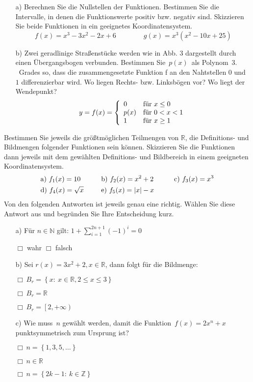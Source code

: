 	\begin{itemize}
		\item[a)] Berechnen Sie die Nullstellen der Funktionen. Bestimmen Sie die Intervalle, in denen die Funktionswerte positiv bzw. negativ sind. Skizzieren Sie beide Funktionen in ein geeignetes Koordinatensystem.
		\begin{equation*}
			f(x)= x^3 - 3x^2 - 2x + 6 \qquad \qquad g(x)= x^3\left(x^2 - 10x + 25\right)
		\end{equation*}
		\item[b)] Zwei geradlinige Straßenstücke werden wie in Abb. 3 dargestellt durch einen Übergangsbogen verbunden. Bestimmen Sie~$p(x)$~als Polynom~$3.$~Grades so, dass die zusammengesetzte Funktion f an den Nahtstellen $0$ und $1$ differenzierbar wird. Wo liegen Rechts- bzw. Linksbögen vor? Wo liegt der Wendepunkt?
		\begin{equation*}
			y=f(x)= \left\{ \begin{array}{ll}
				0 & \textnormal{für}~x \leq 0\\
				p(x) & \textnormal{für}~0<x<1\\
				1 & \textnormal{für}~x \geq 1
				\end{array}
			\right.
		\end{equation*}
	\end{itemize}
	Bestimmen Sie jeweils die größtmöglichen Teilmengen von $\mathbb{R}$, die Definitions- und Bildmengen folgender Funktionen sein können. Skizzieren Sie die Funktionen dann jeweils mit dem gewählten Definitions- und Bildbereich in einem geeigneten Koordinatensystem.
		\begin{alignat*}{3}
			&\textnormal{a)}~f_1(x)= 10 \qquad &&\textnormal{b)}~f_2(x)= x^2 + 2 \qquad &&\textnormal{c)}~f_3(x)= x^3\\
			&\textnormal{d)}~f_4(x)= \sqrt{x} &&\textnormal{e)}~f_5(x)= |x| - x &&
		\end{alignat*}
		Von den folgenden Antworten ist jeweils genau eine richtig. Wählen Sie diese Antwort aus und begründen Sie Ihre Entscheidung kurz.
		\begin{itemize}
			\item[a)] Für $n \in \mathbb{N}$ gilt: $1+\sum_{i=1}^{2n+1}\left(-1\right)^i = 0$
			
			$\Box$ wahr \qquad \quad $\Box$ falsch
			\item[b)] Sei $r(x)= 3x^2 + 2, x \in \mathbb{R}$, dann folgt für die Bildmenge:
			
			$\Box~ B_r= \left\{x:~x \in \mathbb{R}, 2 \leq x \leq 3\right\}$
			
			$\Box~ B_r= \mathbb{R}$
			
			$\Box~ B_r= \left[2, + \infty\right)$
			\item[c)] Wie muss~$n$ gewählt werden, damit die Funktion~$f(x)= 2x^n + x$ punktsymmetrisch zum Ursprung ist?
			
			$\Box~ n= \left\{1,3,5,\dots\right\}$
			
			$\Box~ n\in \mathbb{R}$
			
			$\Box~ n= \left\{2k-1:~k \in \mathbb{Z}\right\}$
		\end{itemize}
